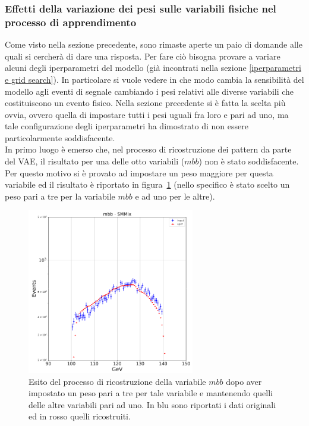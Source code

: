 \newpage

\subsubsection{Effetti della variazione dei pesi sulle variabili fisiche nel processo di apprendimento}
\label{effetti variazione pesi}

Come visto nella sezione precedente, sono rimaste aperte un paio di domande alle quali si cercherà di dare una risposta. Per fare ciò bisogna provare a variare alcuni degli iperparametri del modello (già incontrati nella sezione \ref{iperparametri e grid search}). In particolare si vuole vedere in che modo cambia la sensibilità del modello agli eventi di segnale cambiando i pesi relativi alle diverse variabili che costituiscono un evento fisico. Nella sezione precedente si è fatta la scelta più ovvia, ovvero quella di impostare tutti i pesi uguali fra loro e pari ad uno, ma tale configurazione degli iperparametri ha dimostrato di non essere particolarmente soddisfacente. \\
In primo luogo è emerso che, nel processo di ricostruzione dei pattern da parte del VAE, il risultato per una delle otto variabili ($\textit{mbb}$) non è stato soddisfacente. Per questo motivo si è provato ad impostare un peso maggiore per questa variabile ed il risultato è riportato in figura~\ref{mbb_ottimizzazione} (nello specifico è stato scelto un peso pari a tre per la variabile $\textit{mbb}$ e ad uno per le altre).

\begin{figure}[h!]
	\centering
	\includegraphics[width=0.65\textwidth]{figs/risultati_simulazione/verifica_mbb.png}
	\caption{Esito del processo di ricostruzione della variabile $\textit{mbb}$ dopo aver impostato un peso pari a tre per tale variabile e mantenendo quelli delle altre variabili pari ad uno. In blu sono riportati i dati originali ed in rosso quelli ricostruiti.}
	\label{mbb_ottimizzazione}
\end{figure}

